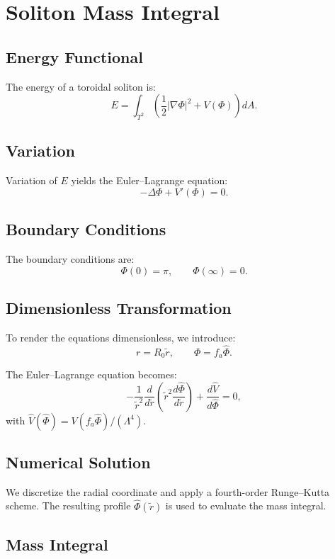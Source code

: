 \documentclass[12pt,oneside]{book}
\begin{document}
\chapter{Soliton Mass Integral}

\section{Energy Functional}

The energy of a toroidal soliton is:
\[
E = \int_{T^2} \left( \frac{1}{2}|\nabla\Phi|^2 + V(\Phi) \right) dA.
\]

\section{Variation}

Variation of $E$ yields the Euler--Lagrange equation:
\[
-\Delta \Phi + V'(\Phi) = 0.
\]

\section{Boundary Conditions}

The boundary conditions are:
\[
\Phi(0) = \pi, \qquad \Phi(\infty) = 0.
\]

\section{Dimensionless Transformation}

To render the equations dimensionless, we introduce:
\[
r = R_0 \tilde{r}, \qquad \Phi = f_a \hat{\Phi}.
\]

The Euler--Lagrange equation becomes:
\[
-\frac{1}{\tilde{r}^2}\frac{d}{d\tilde{r}}\left(\tilde{r}^2 \frac{d\hat{\Phi}}{d\tilde{r}}\right) + \frac{d\hat{V}}{d\hat{\Phi}} = 0,
\]
with $\hat{V}(\hat{\Phi}) = V(f_a \hat{\Phi}) / (\Lambda^4)$.

\section{Numerical Solution}

We discretize the radial coordinate and apply a fourth-order Runge--Kutta scheme. The resulting profile $\hat{\Phi}(\tilde{r})$ is used to evaluate the mass integral.

\section{Mass Integral}
\end{document}
